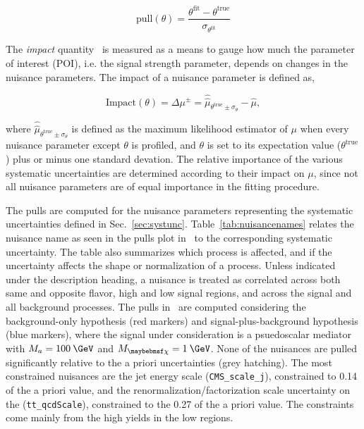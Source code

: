 \begin{equation}
  \textrm{pull}(\theta) = \frac{\theta^{\textrm{fit}}-\theta^{\textrm{true}}}{\sigma_{\theta^{\textrm{fit}}}}
  \label{eq:pulls}
\end{equation}

The \textit{impact} quantity~\cite{CYRSP303} is measured as a means to gauge how much the parameter of interest (POI), i.e. the signal strength parameter, depends on changes in the nuisance parameters. The impact of a nuisance parameter is defined as,

\begin{equation}
  \textrm{Impact}(\theta) = \Delta\mu^{\pm} = \hat{\hat{\mu}}_{\theta^{\textrm{true}}\pm\sigma_{\theta}} - \hat{\mu},
  \label{eq:impact}
\end{equation}

where $\hat{\hat{\mu}}_{\theta^{\textrm{true}}\pm\sigma_{\theta}}$ is defined as the maximum likelihood estimator of $\mu$ when every nuisance parameter except $\theta$ is profiled, and $\theta$ is set to its expectation value ($\theta^{\textrm{true}}$) plus or minus one standard devation. The relative importance of the various systematic uncertainties are determined according to their impact on $\mu$, since not all nuisance parameters are of equal importance in the fitting procedure.

The pulls are computed for the nuisance parameters representing the systematic uncertainties defined in Sec.~\ref{sec:systunc}. Table~\ref{tab:nuisancenames} relates the nuisance name as seen in the pulls plot in~ to the corresponding systematic uncertainty. The table also summarizes which process is affected, and if the uncertainty affects the shape or normalization of a process. Unless indicated under the description heading, a nuisance is treated as correlated across both same and opposite flavor, high and low \mttll signal regions, and across the signal and all background processes. The pulls in~ are computed considering the background-only hypothesis (red markers) and signal-plus-background hypothesis (blue markers), where the signal under consideration is a psuedoscalar mediator with $M_{a}=100\:\GeV$ and $M_{\chi}=1\:\GeV$. None of the nuisances are pulled significantly relative to the a priori uncertainties (grey hatching). The most constrained nuisances are the jet energy scale (\texttt{CMS\_scale\_j}), constrained to 0.14 of the a priori value, and the renormalization/factorization scale uncertainty on the \ttll (\texttt{tt\_qcdScale}), constrained to the 0.27 of the a priori value. The constraints come mainly from the high yields in the low \mttll regions.

